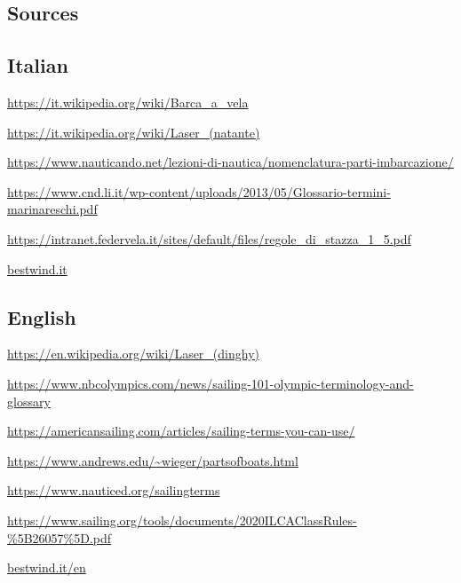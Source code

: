 \documentclass[a4paper, 12pt, twoside]{article}
\begin{document}
    \begin{indt}{\section{Sources}} %
        \begin{indt}{\subsection{Italian}} %
            \url{https://it.wikipedia.org/wiki/Barca_a_vela}

            \url{https://it.wikipedia.org/wiki/Laser_(natante)}

            \href{https://www.nauticando.net/lezioni-di-nautica/nomenclatura-parti-imbarcazione/}{{https://www.nauticando.net/lezioni-di-nautica/nomenclatura-parti-imbarcazione/}}

            \href{https://www.cnd.li.it/wp-content/uploads/2013/05/Glossario-termini-marinareschi.pdf}{https://www.cnd.li.it/wp-content/uploads/2013/05/Glossario-termini-marinareschi.pdf}

            \url{https://intranet.federvela.it/sites/default/files/regole_di_stazza_1_5.pdf}

            \url{bestwind.it}
        \end{indt} %

        \begin{indt}{\subsection{English}} %
            \url{https://en.wikipedia.org/wiki/Laser_(dinghy)}

            \href{https://www.nbcolympics.com/news/sailing-101-olympic-terminology-and-glossary}{https://www.nbcolympics.com/news/sailing-101-olympic-terminology-and-glossary}

            \url{https://americansailing.com/articles/sailing-terms-you-can-use/}

            \url{https://www.andrews.edu/~wieger/partsofboats.html}

            \url{https://www.nauticed.org/sailingterms}

            \url{https://www.sailing.org/tools/documents/2020ILCAClassRules-%5B26057%5D.pdf}

            \url{bestwind.it/en}
        \end{indt} %
    \end{indt} %
    
\end{document}
